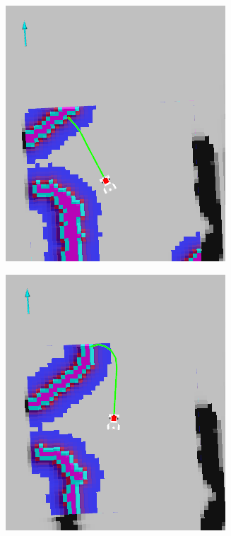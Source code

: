 \documentclass{beamer}
\begin{document}
\begin{frame}
\begin{figure}[H]
\begin{subfigure}[b]{0.24\textwidth}
        \centering
        \includegraphics[width=\textwidth]{img/succ_1.png}
    \end{subfigure}
    \hfill
    \begin{subfigure}[b]{0.24\textwidth}
        \centering
        \includegraphics[width=\textwidth]{img/succ_2.png}

\end{subfigure}
\end{figure}
\end{frame}
\end{document}
